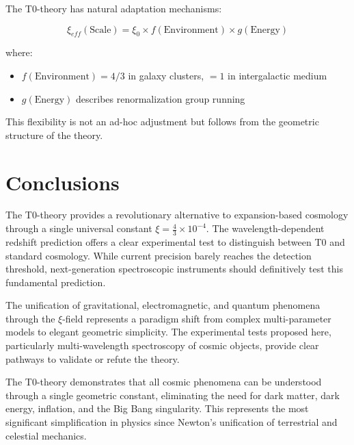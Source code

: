 \documentclass[12pt,a4paper]{article}
\newcommand{\xiconst}{\xi = \frac{4}{3} \times 10^{-4}}
\theoremstyle{definition}
\begin{document}
	The T0-theory has natural adaptation mechanisms:
	
	\begin{equation}
		\xi_{eff}(\text{Scale}) = \xi_0 \times f(\text{Environment}) \times g(\text{Energy})
	\end{equation}
	
	where:
	\begin{itemize}
		\item $f(\text{Environment}) = 4/3$ in galaxy clusters, $= 1$ in intergalactic medium
		\item $g(\text{Energy})$ describes renormalization group running
	\end{itemize}
	
	This flexibility is not an ad-hoc adjustment but follows from the geometric structure of the theory.
	
	\section{Conclusions}
	
	The T0-theory provides a revolutionary alternative to expansion-based cosmology through a single universal constant $\xiconst$. The wavelength-dependent redshift prediction offers a clear experimental test to distinguish between T0 and standard cosmology. While current precision barely reaches the detection threshold, next-generation spectroscopic instruments should definitively test this fundamental prediction.
	
	The unification of gravitational, electromagnetic, and quantum phenomena through the $\xi$-field represents a paradigm shift from complex multi-parameter models to elegant geometric simplicity. The experimental tests proposed here, particularly multi-wavelength spectroscopy of cosmic objects, provide clear pathways to validate or refute the theory.
	
	\begin{revolutionary}
		The T0-theory demonstrates that all cosmic phenomena can be understood through a single geometric constant, eliminating the need for dark matter, dark energy, inflation, and the Big Bang singularity. This represents the most significant simplification in physics since Newton's unification of terrestrial and celestial mechanics.
	\end{revolutionary}
	
\end{document}
